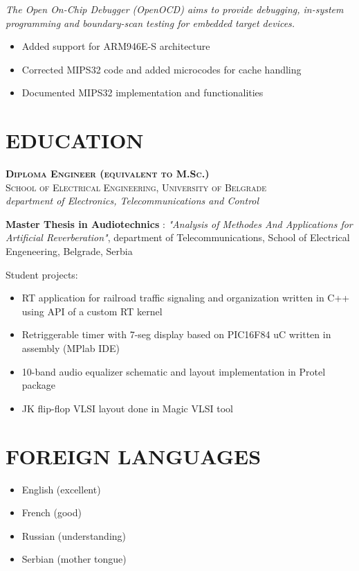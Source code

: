 \documentclass[a4paper, oneside, final]{scrartcl}
\begin{document}
\begin{itemize}
      \textit{The Open On-Chip Debugger (OpenOCD) aims to provide debugging,
         in-system programming and boundary-scan testing for embedded target
            devices.}
      \begin{itemize}
         \item Added support for ARM946E-S architecture
         \item Corrected MIPS32 code and added microcodes for cache handling
         \item Documented MIPS32 implementation and functionalities
      \end{itemize}
\end{itemize}


\section{EDUCATION}

   \textbf{\textsc{Diploma Engineer (equivalent to M.Sc.)}} \\
   \textsc{School of Electrical Engineering, University of Belgrade} \\
   \textit{department of Electronics, Telecommunications and Control}

   \textbf{Master Thesis in Audiotechnics} : \textit{"Analysis of Methodes And 
         Applications for Artificial Reverberation"}, department of 
         Telecommunications, School of Electrical Engeneering, Belgrade, Serbia

\medskip
   
   Student projects:

\begin{itemize}
   \item RT application for railroad traffic signaling 
            and organization written in C++ using API of a custom RT kernel
   \item Retriggerable timer with 7-seg display 
            based on PIC16F84 uC written in assembly (MPlab IDE)
   \item 10-band audio equalizer schematic and 
            layout implementation in Protel package
   \item JK flip-flop VLSI layout done in Magic VLSI tool
\end{itemize}


\section{FOREIGN LANGUAGES}
\begin{itemize}
   \item English (excellent)
   \item French (good)
   \item Russian (understanding)
   \item Serbian (mother tongue)
\end{itemize}
\end{document}
